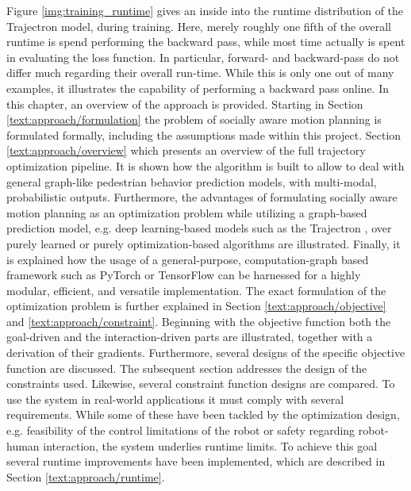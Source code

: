 Figure \ref{img:training_runtime} gives an inside into the runtime distribution of the Trajectron model, during training. Here, merely roughly one fifth of the overall runtime is spend performing the backward pass, while most time actually is spent in evaluating the loss function. In particular, forward- and backward-pass do not differ much regarding their overall run-time. While this is only one out of many examples, it illustrates the capability of performing a backward pass online.  
\newline\newline
In this chapter, an overview of the approach is provided. Starting in Section \ref{text:approach/formulation} the problem of socially aware motion planning is formulated formally, including the assumptions made within this project. 
\newline
Section \ref{text:approach/overview} which presents an overview of the full trajectory optimization pipeline. It is shown how the algorithm is built to allow to deal with general graph-like pedestrian behavior prediction models, with multi-modal, probabilistic outputs. Furthermore, the advantages of formulating socially aware motion planning as an optimization problem while utilizing a graph-based prediction model, e.g. deep learning-based models such as the Trajectron \cite{Ivanovic2018}, over purely learned \cite{Chen2017} or purely optimization-based \cite{Berg2011} algorithms are illustrated. Finally, it is explained how the usage of a general-purpose, computation-graph based framework such as PyTorch \cite{pytorch} or TensorFlow \cite{tensorflow} can be harnessed for a highly modular, efficient, and versatile implementation.
\newline
The exact formulation of the optimization problem is further explained in Section \ref{text:approach/objective} and \ref{text:approach/constraint}. Beginning with the objective function both the goal-driven and the interaction-driven parts are illustrated, together with a derivation of their gradients. Furthermore, several designs of the specific objective function are discussed. The subsequent section addresses the design of the constraints used. Likewise, several constraint function designs are compared. 
\newline
To use the system in real-world applications it must comply with several requirements. While some of these have been tackled by the optimization design, e.g. feasibility of the control limitations of the robot or safety regarding robot-human interaction, the system underlies runtime limits. To achieve this goal several runtime improvements have been implemented, which are described in Section \ref{text:approach/runtime}.

